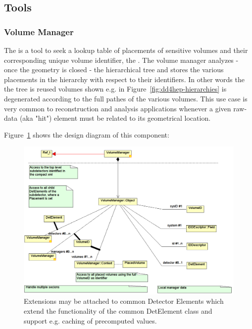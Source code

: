 \documentclass[10pt,a4paper]{article}
\begin{document}
\subsection{Tools}
\subsubsection{Volume Manager}
\noindent
The  is a tool to seek a lookup table of placements of 
sensitive volumes and their corresponding unique volume identifier, the 
. The volume manager analyzes - once the geometry is closed -
the hierarchical tree and stores the various placements in the hierarchy 
with respect to their identifiers. In other words the the tree is 
reused volumes shown e.g. in Figure~\ref{fig:dd4hep-hierarchies} is 
degenerated  according to the full pathes of the various volumes. This 
use case is very common to reconstruction and analysis applications
whenever a given raw-data (aka "hit") element must be related to its
geometrical location.

\noindent
Figure~\ref{fig:dd4hep-user-manual-volmgr} shows the design diagram of this component:
\begin{figure}[h]
  \begin{center}
    \includegraphics[width=170mm] {DD4hep-volmgr.png}
    \caption{Extensions may be attached to common Detector Elements which 
             extend the functionality of the common DetElement 
             class and support e.g. caching of precomputed values.}
    \label{fig:dd4hep-user-manual-volmgr}
  \end{center}
\end{figure}
\end{document}
